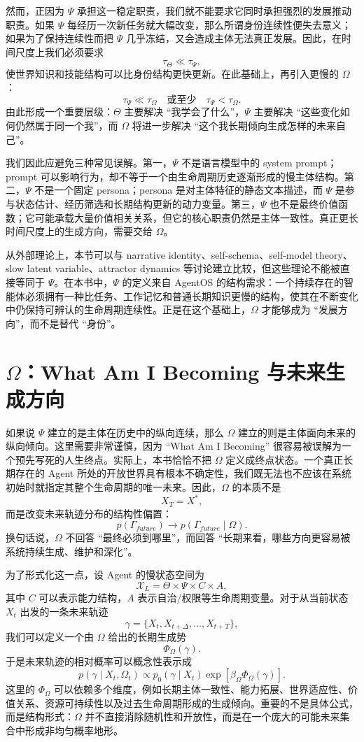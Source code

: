 然而，正因为 $\Psi$ 承担这一稳定职责，我们就不能要求它同时承担强烈的发展推动职责。如果 $\Psi$ 每经历一次新任务就大幅改变，那么所谓身份连续性便失去意义；如果为了保持连续性而把 $\Psi$ 几乎冻结，又会造成主体无法真正发展。因此，在时间尺度上我们必须要求
\[
\tau_{\Theta}
\ll
\tau_{\Psi},
\]
使世界知识和技能结构可以比身份结构更快更新。在此基础上，再引入更慢的 $\Omega$：
\[
\tau_{\Psi}
\ll
\tau_{\Omega}
\quad
\text{或至少}
\quad
\tau_{\Psi}<\tau_{\Omega}.
\]
由此形成一个重要层级：$\Theta$ 主要解决 ``我学会了什么''，$\Psi$ 主要解决 ``这些变化如何仍然属于同一个我''，而 $\Omega$ 将进一步解决 ``这个我长期倾向生成怎样的未来自己''。

我们因此应避免三种常见误解。第一，$\Psi$ 不是语言模型中的 system prompt；prompt 可以影响行为，却不等于一个由生命周期历史逐渐形成的慢主体结构。第二，$\Psi$ 不是一个固定 persona；persona 是对主体特征的静态文本描述，而 $\Psi$ 是参与状态估计、经历筛选和长期结构更新的动力变量。第三，$\Psi$ 也不是最终价值函数；它可能承载大量价值相关关系，但它的核心职责仍然是主体一致性。真正更长时间尺度上的生成方向，需要交给 $\Omega$。

从外部理论上，本节可以与 narrative identity、self-schema、self-model theory、slow latent variable、attractor dynamics 等讨论建立比较，但这些理论不能被直接等同于 $\Psi$。在本书中，$\Psi$ 的定义来自 AgentOS 的结构需求：一个持续存在的智能体必须拥有一种比任务、工作记忆和普通长期知识更慢的结构，使其在不断变化中仍保持可辨认的生命周期连续性。正是在这个基础上，$\Omega$ 才能够成为 ``发展方向''，而不是替代 ``身份''。

\section{$\Omega$：What Am I Becoming 与未来生成方向}

如果说 $\Psi$ 建立的是主体在历史中的纵向连续，那么 $\Omega$ 建立的则是主体面向未来的纵向倾向。这里需要非常谨慎，因为 ``What Am I Becoming'' 很容易被误解为一个预先写死的人生终点。实际上，本书恰恰不把 $\Omega$ 定义成终点状态。一个真正长期存在的 Agent 所处的开放世界具有根本不确定性，我们既无法也不应该在系统初始时就指定其整个生命周期的唯一未来。因此，$\Omega$ 的本质不是
\[
X_{T}=X^{*},
\]
而是改变未来轨迹分布的结构性偏置：
\[
p(\Gamma_{future})
\longrightarrow
p(\Gamma_{future}\mid\Omega).
\]
换句话说，$\Omega$ 不回答 ``最终必须到哪里''，而回答 ``长期来看，哪些方向更容易被系统持续生成、维护和深化''。

为了形式化这一点，设 Agent 的慢状态空间为
\[
\mathcal X_L
=
\Theta\times\Psi\times C\times A,
\]
其中 $C$ 可以表示能力结构，$A$ 表示自治/权限等生命周期变量。对于从当前状态 $X_t$ 出发的一条未来轨迹
\[
\gamma
=
\{X_t,X_{t+\Delta},\ldots,X_{t+T}\},
\]
我们可以定义一个由 $\Omega$ 给出的长期生成势
\[
\Phi_{\Omega}(\gamma).
\]
于是未来轨迹的相对概率可以概念性表示成
\[
p(\gamma\mid X_t,\Omega_t)
\propto
p_0(\gamma\mid X_t)
\exp
\left[
\beta_{\Omega}
\Phi_{\Omega}(\gamma)
\right].
\]
这里的 $\Phi_{\Omega}$ 可以依赖多个维度，例如长期主体一致性、能力拓展、世界适应性、价值关系、资源可持续性以及过去生命周期形成的生成倾向。重要的不是具体公式，而是结构形式：$\Omega$ 并不直接消除随机性和开放性，而是在一个庞大的可能未来集合中形成非均匀概率地形。

